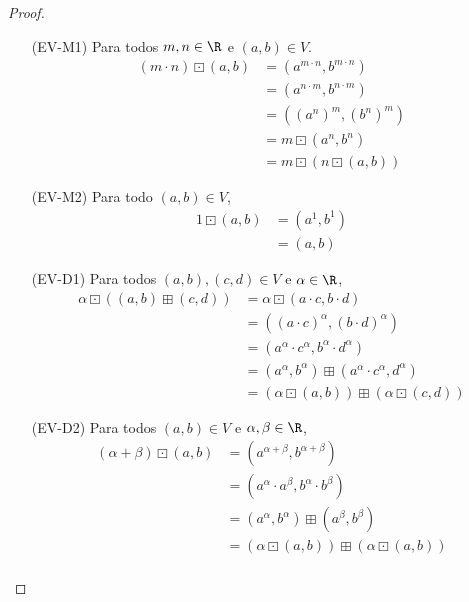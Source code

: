 \begin{proof}
\begin{itemize}
\item [(EV-M1)] Para todos $m, n \in \R$ e $(a, b) \in V$.
\begin{align*}
  (m\cdot n) \boxdot (a, b) &= (a^{m\cdot n}, b^{m\cdot n}) \tag{M}\\
    &= (a^{n\cdot m}, b^{n\cdot m})\\
    &= ((a^n)^m, (b^n)^m) \\
    &= m \boxdot (a^n, b^n) \tag{M}\\
    &= m \boxdot (n \boxdot (a, b)) \tag{M}
\end{align*}

\item [(EV-M2)] Para todo $(a, b) \in V$,
\begin{align*}
    1 \boxdot (a, b) &= (a^1, b^1) \tag{M}\\
    &= (a, b)
\end{align*}

\item [(EV-D1)] Para todos  $(a, b), (c, d) \in V$ e $\alpha \in \R$,
\begin{align*}
 \alpha \boxdot ((a, b) \boxplus (c, d)) &= \alpha \boxdot (a\cdot c, b \cdot d) \tag{A}\\
 &= ((a\cdot c)^\alpha, (b \cdot d)^\alpha) \tag{M}\\
 &= (a^\alpha\cdot c^\alpha, b^\alpha \cdot d^\alpha) \\
 &= (a^\alpha, b^\alpha) \boxplus (a^\alpha\cdot c^\alpha, d^\alpha) \tag{A}\\
 &= (\alpha \boxdot (a, b)) \boxplus (\alpha \boxdot (c, d)) \tag{M}
\end{align*}

\item [(EV-D2)] Para todos  $(a, b) \in V$ e $\alpha, \beta \in \R$,
\begin{align*}
    (\alpha + \beta) \boxdot (a, b) &= (a^{\alpha + \beta}, b^{\alpha + \beta}) \tag{M} \\
    &= (a^\alpha \cdot a^\beta, b^\alpha \cdot b^\beta) \\
    &= (a^\alpha, b^\alpha) \boxplus (a^\beta, b^\beta) \tag{A} \\
    &= (\alpha \boxdot (a, b)) \boxplus (\alpha \boxdot (a, b)) \tag{M} \\
\end{align*}

\end{itemize}

\end{proof}